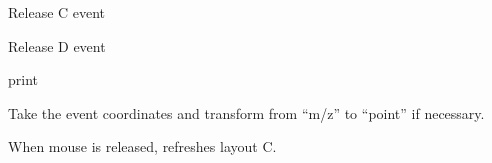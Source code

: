 \documentclass[letterpaper,10pt,openany,oneside]{sphinxmanual}
\begin{document}
\begin{fulllineitems}
\begin{fulllineitems}
\end{fulllineitems}


\begin{fulllineitems}
\label{rst/visu2d:Visu.canvas_event.CANVAS_EVENT.on_release_C_event}
Release C event

\end{fulllineitems}


\begin{fulllineitems}
\label{rst/visu2d:Visu.canvas_event.CANVAS_EVENT.on_release_D_event}
Release D event

\end{fulllineitems}


\begin{fulllineitems}
\label{rst/visu2d:Visu.canvas_event.CANVAS_EVENT.pr}
print

\end{fulllineitems}


\begin{fulllineitems}
\label{rst/visu2d:Visu.canvas_event.CANVAS_EVENT.recupxy}
Take the event coordinates and transform from ``m/z'' to ``point'' if necessary.

\end{fulllineitems}


\begin{fulllineitems}
\label{rst/visu2d:Visu.canvas_event.CANVAS_EVENT.release_refrechC}
When mouse is released, refreshes layout C.

\end{fulllineitems}


\end{fulllineitems}
\end{document}
